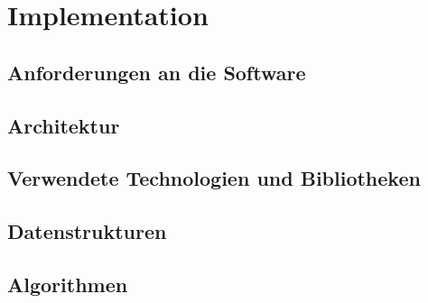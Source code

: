 %
\chapter{Implementation}

\section{Anforderungen an die Software}

\section{Architektur}

\section{Verwendete Technologien und Bibliotheken}

\section{Datenstrukturen}

\section{Algorithmen}
